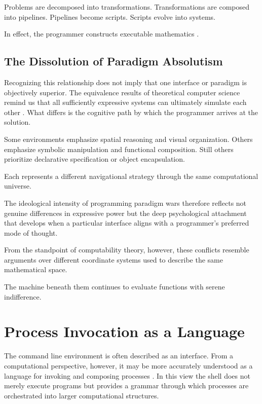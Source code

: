 \documentclass[12pt]{article}
\theoremstyle{definition}
\begin{document}
Problems are decomposed into transformations.
Transformations are composed into pipelines.
Pipelines become scripts.
Scripts evolve into systems.

In effect, the programmer constructs executable mathematics \cite{knuth1984}.

\subsection{The Dissolution of Paradigm Absolutism}

Recognizing this relationship does not imply that one interface or
paradigm is objectively superior. The equivalence results of theoretical
computer science remind us that all sufficiently expressive systems can
ultimately simulate each other \cite{kleene1952}. What differs is the
cognitive path by which the programmer arrives at the solution.

Some environments emphasize spatial reasoning and visual organization.
Others emphasize symbolic manipulation and functional composition.
Still others prioritize declarative specification or object
encapsulation.

Each represents a different navigational strategy through the same
computational universe.

The ideological intensity of programming paradigm wars therefore
reflects not genuine differences in expressive power but the deep
psychological attachment that develops when a particular interface
aligns with a programmer's preferred mode of thought.

From the standpoint of computability theory, however, these conflicts
resemble arguments over different coordinate systems used to describe
the same mathematical space.

The machine beneath them continues to evaluate functions with serene
indifference.

\section{Process Invocation as a Language}

The command line environment is often described as an interface. From a
computational perspective, however, it may be more accurately understood
as a language for invoking and composing processes \cite{fant2006}. In
this view the shell does not merely execute programs but provides a
grammar through which processes are orchestrated into larger
computational structures.
\end{document}
